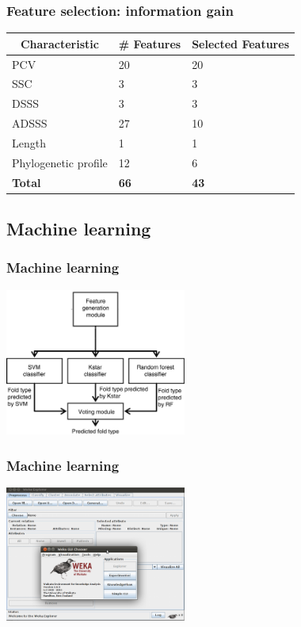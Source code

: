 \documentclass{beamer}
\begin{document}
\begin{frame}
  \frametitle{Feature selection: information gain}
  \begin{table} \centering
  \begin{tabular}{ l l l }
    \hline
    \multicolumn{1}{c}{\textbf{Characteristic}} & \textbf{\# Features} & \multicolumn{1}{c}{\textbf{Selected Features}} \\ \hline
    PCV    & 20 & 20 \\
    SSC    & 3  & 3 \\
    DSSS   & 3  & 3 \\
    ADSSS  & 27 & 10 \\
    Length & 1 & 1 \\
    Phylogenetic profile & 12 & 6 \\
    \textbf{Total} & \textbf{66} & \textbf{43} \\ \hline
  \end{tabular}
  \vspace{5px}
\end{table}
\end{frame}

\subsection{Machine learning}
\begin{frame}
  \frametitle{Machine learning}
  \begin{center}
    \includegraphics[width=225px]{pfres.jpg}
  \end{center}  
\end{frame}
\begin{frame}
  \frametitle{Machine learning}
  \begin{center}
    \includegraphics[width=225px]{weka.png}
  \end{center}  
\end{frame}
\end{document}
